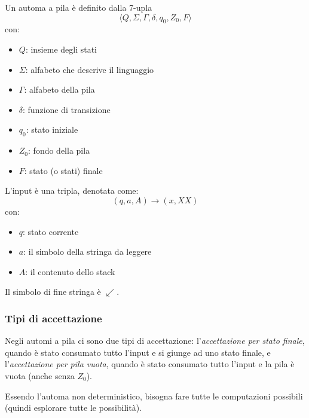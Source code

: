 \documentclass[11pt]{article}
\begin{document}
Un automa a pila è definito dalla 7-upla 
\begin{equation*}
    \langle Q,\Sigma,\Gamma,\delta,q_0,Z_0,F \rangle
\end{equation*}
con:
\begin{itemize}
    \item $Q$: insieme degli stati
    \item $\Sigma$: alfabeto che descrive il linguaggio
    \item $\Gamma$: alfabeto della pila 
    \item $\delta$: funzione di transizione
    \item $q_0$: stato iniziale 
    \item $Z_0$: fondo della pila 
    \item $F$: stato (o stati) finale
\end{itemize}
L'input è una tripla, denotata come:
\begin{equation*}
    (q,a,A)\rightarrow(x,XX)
\end{equation*}
con:
\begin{itemize}
    \item $q$: stato corrente
    \item $a$: il simbolo della stringa da leggere
    \item $A$: il contenuto dello stack
\end{itemize}
Il simbolo di fine stringa è $\swarrow$.
\subsubsection{Tipi di accettazione}
Negli automi a pila ci sono due tipi di accettazione: l'\textit{accettazione per stato finale}, quando è stato consumato 
tutto l'input e si giunge ad uno stato finale, e l'\textit{accettazione per pila vuota}, quando è stato consumato tutto 
l'input e la pila è vuota (anche senza $Z_0$).

Essendo l'automa non deterministico, bisogna fare tutte le computazioni possibili (quindi esplorare tutte le possibilità).
\end{document}
